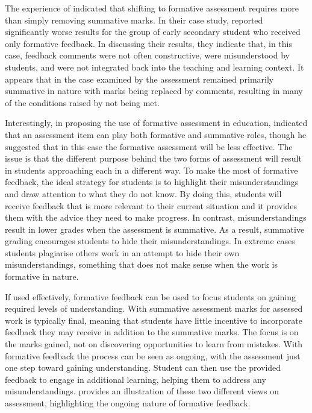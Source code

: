 
The experience of \citet{Smith:2005} indicated that shifting to formative assessment requires more than simply removing summative marks. In their case study, \citet{Smith:2005} reported significantly worse results for the group of early secondary student who received only formative feedback. In discussing their results, they indicate that, in this case, feedback comments were not often constructive, were misunderstood by students, and were not integrated back into the teaching and learning context. It appears that in the case examined by \citet{Smith:2005} the assessment remained primarily summative in nature with marks being replaced by comments, resulting in many of the conditions raised by \citet{Gibbs:2004} not being met.

Interestingly, in proposing the use of formative assessment in education, \citet{Bloom:1969} indicated that an assessment item can play both formative and summative roles, though he suggested that in this case the formative assessment will be less effective. The issue is that the different purpose behind the two forms of assessment will result in students approaching each in a different way. To make the most of formative feedback, the ideal strategy for students is to highlight their misunderstandings and draw attention to what they do not know. By doing this, students will receive feedback that is more relevant to their current situation and it provides them with the advice they need to make progress. In contrast, misunderstandings result in lower grades when the assessment is summative. As a result, summative grading encourages students to hide their misunderstandings. In extreme cases students plagiarise others work in an attempt to hide their own misunderstandings, something that does not make sense when the work is formative in nature. 

If used effectively, formative feedback can be used to focus students on gaining required levels of understanding. With summative assessment marks for assessed work is typically final, meaning that students have little incentive to incorporate feedback they may receive in addition to the summative marks. The focus is on the marks gained, not on discovering opportunities to learn from mistakes. With formative feedback the process can be seen as ongoing, with the assessment just one step toward gaining understanding. Student can then use the provided feedback to engage in additional learning, helping them to address any misunderstandings.  provides an illustration of these two different views on assessment, highlighting the ongoing nature of formative feedback.

